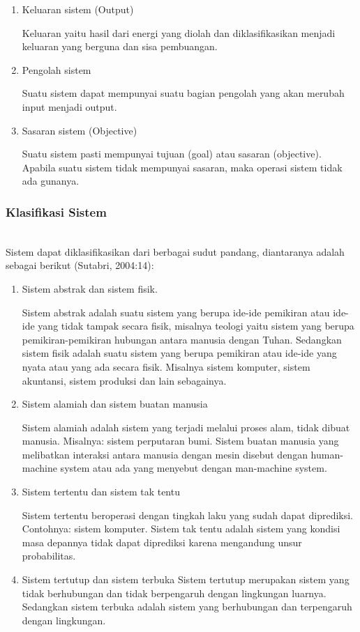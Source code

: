 \begin{enumerate}
	\item Keluaran sistem (Output)
	
Keluaran yaitu hasil dari energi yang diolah dan diklasifikasikan menjadi keluaran yang berguna dan sisa pembuangan.

	\item Pengolah sistem
	
Suatu sistem dapat mempunyai suatu bagian pengolah yang akan merubah input menjadi output.
	
	\item Sasaran sistem (Objective)
	
Suatu sistem pasti mempunyai tujuan (goal) atau sasaran (objective). Apabila suatu sistem tidak mempunyai sasaran, maka operasi sistem tidak ada gunanya.
\end{enumerate}

\subsubsection{Klasifikasi Sistem}
\hfill\\
Sistem dapat diklasifikasikan dari berbagai sudut pandang, diantaranya adalah sebagai berikut (Sutabri, 2004:14):

\begin{enumerate}
	\item Sistem abstrak dan sistem fisik. 
	
	Sistem abstrak adalah suatu sistem yang berupa ide-ide pemikiran atau ide-ide yang tidak tampak secara fisik, misalnya teologi yaitu sistem yang berupa pemikiran-pemikiran hubungan antara manusia dengan Tuhan.
Sedangkan sistem fisik adalah suatu sistem yang berupa pemikiran atau ide-ide yang nyata atau yang ada secara fisik. Misalnya sistem komputer, sistem akuntansi, sistem produksi dan lain sebagainya.

	\item Sistem alamiah dan sistem buatan manusia

	Sistem alamiah adalah sistem yang terjadi melalui proses alam, tidak dibuat manusia. Misalnya: sistem perputaran bumi. Sistem buatan manusia yang melibatkan interaksi antara manusia dengan mesin disebut dengan human-machine system atau ada yang menyebut dengan man-machine system.

	\item Sistem tertentu dan sistem tak tentu

	Sistem tertentu beroperasi dengan tingkah laku yang sudah dapat diprediksi. Contohnya: sistem komputer. Sistem tak tentu adalah sistem yang kondisi  masa depannya tidak dapat diprediksi karena mengandung unsur probabilitas.

	\item Sistem tertutup dan sistem terbuka
	Sistem tertutup merupakan sistem yang tidak berhubungan dan tidak berpengaruh dengan lingkungan luarnya. Sedangkan sistem terbuka adalah sistem yang berhubungan dan terpengaruh dengan lingkungan.

\end{enumerate}

